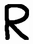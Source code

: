 \documentclass[russian,utf8,emptystyle]{eskdtext}
\begin{document}
\begin{figure}[!htb]
\includegraphics[width=\linewidth]{../data/learn/r/001}
\endminipage\hfill
{}

\end{figure}
\end{document}
